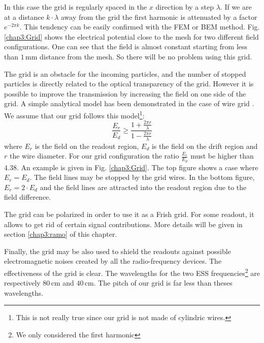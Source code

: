 \begin{refsection}
  In this case the grid is regularly spaced in the $x$ direction by a step $\lambda$. If we are at a distance $k \cdot \lambda$ away from the grid the first harmonic is attenuated by a factor $e^{-2\pi k}$. This tendency can be easily confirmed with the FEM or BEM method. Fig. \ref{chap3:Grid} shows the electrical potential close to the mesh for two different field configurations. One can see that the field is almost constant starting from less than $1\,\mathrm{mm}$ distance from the mesh. So there will be no problem using this grid.

  

  The grid is an obstacle for the incoming particles, and the number of stopped particles is directly related to the optical transparency of the grid. However it is possible to improve the transmission by increasing the field on one side of the grid. A simple analytical model has been demonstrated in the case of wire grid \cite{Bunemann1949}. We assume that our grid follows this model\footnote{This is not really true since our grid is not made of cylindric wires.}:
  \begin{equation}
    \frac{E_{r}}{E_{d}} \geq \frac{1+\frac{2 \pi r}{\lambda}}{1-\frac{2 \pi r}{\lambda}}
  \end{equation}
  where $E_{r}$ is the field on the readout region, $E_{d}$ is the field on the drift region and $r$ the wire diameter. For our grid configuration the ratio $\frac{E_{r}}{E_{d}}$ must be higher than $4.38$.
  An example is given in Fig. \ref{chap3:Grid}. The top figure shows a case where $E_{r}=E_{d}$. The field lines may be stopped by the grid wires. In the bottom figure, $E_{r}=2 \cdot E_{d}$ and the field lines are attracted into the readout region due to the field difference.

  The grid can be polarized in order to use it as a Frish grid. For some readout, it allows to get rid of certain signal contributions. More details will be given in section \ref{chap3:ramo} of this chapter.

  Finally, the grid may be also used to shield the readouts against possible electromagnetic noises created by all the radio-frequency devices. The effectiveness of the grid is clear. The wavelengths for the two ESS frequencies\footnote{We only considered the first harmonic} are respectively $80\,\mathrm{cm}$ and $40\,\mathrm{cm}$. The pitch of our grid is far less than theses wavelengths.



\end{refsection}
